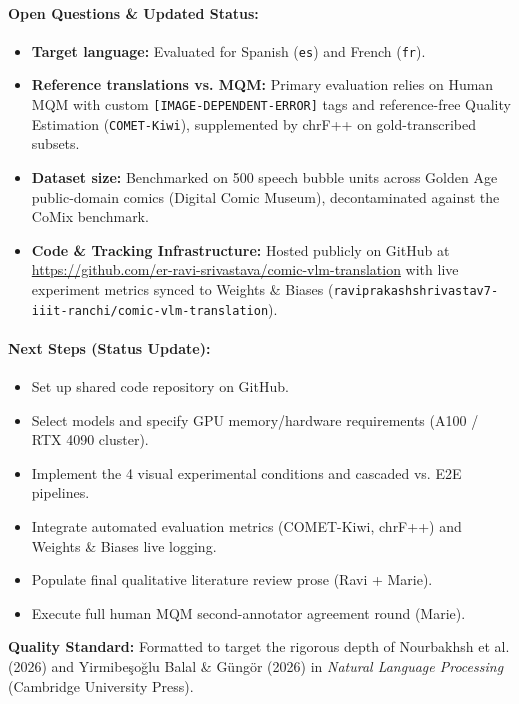 \documentclass[11pt,a4paper]{article}
\begin{document}
\paragraph{Open Questions \& Updated Status:}
\begin{itemize}[noitemsep]
    \item \textbf{Target language:} Evaluated for Spanish (\texttt{es}) and French (\texttt{fr}).
    \item \textbf{Reference translations vs. MQM:} Primary evaluation relies on Human MQM with custom \texttt{[IMAGE-DEPENDENT-ERROR]} tags and reference-free Quality Estimation (\texttt{COMET-Kiwi}), supplemented by chrF++ on gold-transcribed subsets.
    \item \textbf{Dataset size:} Benchmarked on 500 speech bubble units across Golden Age public-domain comics (Digital Comic Museum), decontaminated against the CoMix benchmark.
    \item \textbf{Code \& Tracking Infrastructure:} Hosted publicly on GitHub at \url{https://github.com/er-ravi-srivastava/comic-vlm-translation} with live experiment metrics synced to Weights \& Biases (\texttt{raviprakashshrivastav7-iiit-ranchi/comic-vlm-translation}).
\end{itemize}

\paragraph{Next Steps (Status Update):}
\begin{itemize}[noitemsep]
    \item[$\checkmark$] Set up shared code repository on GitHub.
    \item[$\checkmark$] Select models and specify GPU memory/hardware requirements (A100 / RTX 4090 cluster).
    \item[$\checkmark$] Implement the 4 visual experimental conditions and cascaded vs. E2E pipelines.
    \item[$\checkmark$] Integrate automated evaluation metrics (COMET-Kiwi, chrF++) and Weights \& Biases live logging.
    \item[ ] Populate final qualitative literature review prose (Ravi + Marie).
    \item[ ] Execute full human MQM second-annotator agreement round (Marie).
\end{itemize}

\noindent\textbf{Quality Standard:} Formatted to target the rigorous depth of Nourbakhsh et al. (2026) and Yirmibe\c{s}o\u{g}lu Balal \& G\"ung\"or (2026) in \textit{Natural Language Processing} (Cambridge University Press).
\end{document}
